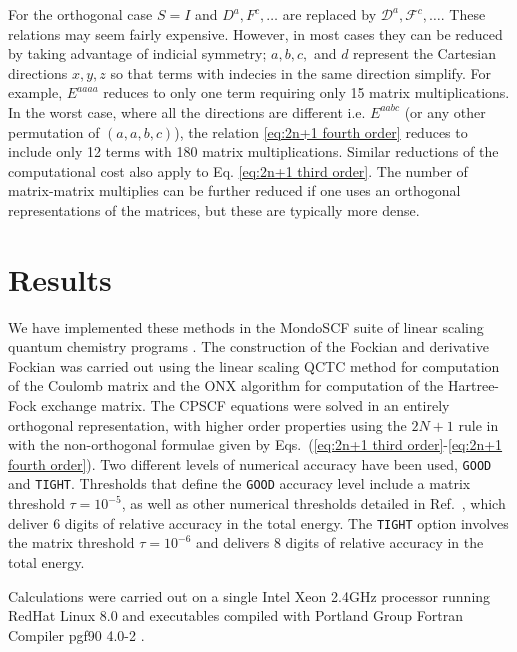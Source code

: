 \documentclass[prl,aps,letterpaper,twocolumn,showpacs,twocolumngrid,superbib]{revtex4}
\def\F{\mathcal{F}}
\def\D{\mathcal{D}}
\begin{document}
For the orthogonal case $S=I$ and $D^a,F^c,\ldots$ are replaced by $\D^a,\F^c,\ldots$.
These relations may seem fairly expensive. However, in most cases they
can be reduced by taking advantage of indicial symmetry; 
$a,b,c,$ and $d$ represent the Cartesian directions $x,y,z$
so that terms with indecies in the same direction simplify. 
For example, $E^{aaaa}$ reduces to only one term requiring only 15 matrix multiplications.
In the worst case, where all the directions are different i.e. $E^{aabc}$ 
(or any other permutation of $(a,a,b,c)$), the relation \eqref{eq:2n+1 fourth order} 
reduces to include only 12 terms with 180 matrix multiplications. 
Similar reductions of the computational cost also apply to 
Eq. \eqref{eq:2n+1 third order}. The number of matrix-matrix multiplies can be further reduced
if one uses an orthogonal representations of the matrices, but these are typically more dense. 



\section{Results} \label{RESULTS}

We have implemented these methods in the MondoSCF suite of linear scaling quantum chemistry 
programs \cite{MondoSCF}.  The construction of the Fockian and derivative Fockian was carried
out using the linear scaling QCTC method for computation of the Coulomb matrix \cite{MChallacombe97,CTymczak04a} and the
ONX algorithm \cite{ESchwegler97,CTymczak04b} for computation of the Hartree-Fock exchange matrix. 
The CPSCF equations were solved in an entirely orthogonal representation,
with higher order properties using the $2 N+1$ rule in with the non-orthogonal formulae given
by Eqs.~(\ref{eq:2n+1 third order}-\ref{eq:2n+1 fourth order}).  Two different levels of numerical 
accuracy have been used, {\tt GOOD} and {\tt TIGHT}.   Thresholds that define the {\tt GOOD} 
accuracy level include a matrix threshold $\tau=10^{-5}$, as well as other numerical thresholds 
detailed in Ref.~, which deliver 6 digits of relative accuracy in the total 
energy.  The {\tt TIGHT} option involves the matrix threshold $\tau=10^{-6}$ and delivers 8 
digits of relative accuracy in the total energy.  

Calculations were carried out on a single Intel Xeon 2.4GHz processor running RedHat Linux 8.0 and  
executables compiled with Portland Group Fortran Compiler pgf90 4.0-2 \cite{PGF90}.
\end{document}
